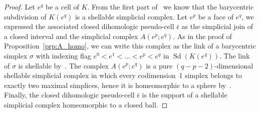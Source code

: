 \documentclass[AHL,Unicode,longabstracts,published]{cedram}
\DeclareMathOperator{\Sd}{Sd}
\begin{document}
\begin{proof}
Let $e^q$ be a cell of $K$. From the first part of~\cite[Proposition~4.4 p.~12]{Bjo_pos_reg}
we know that the barycentric subdivision of $K(e^q)$ is a shellable simplicial complex. Let $e^p$ be a face of $e^q$, we expressed the associated closed dihomologic pseudo-cell $\bar{\epsilon}$ as the simplicial join of a closed interval and the simplicial complex $A(e^p;e^q)$. As in the proof of Proposition~\ref{prp:A_homo}, we can write this complex as the link of a barycentric simplex $\sigma$ with indexing flag $e^0<e^1<\dots<e^p<e^q$ in $\Sd(K(e^q))$. The link of $\sigma$ is shellable by~\cite[Lemma~8.7 p.~237]{Zie_lec_pol}.
 The complex $A(e^p;e^q)$ is a pure $(q-p-2)$-dimensional shellable simplicial complex in which every codimension~1 simplex belongs to exactly two maximal simplices, hence it is homeomorphic to a sphere by~\cite[Proposition~4.3 p.~12]{Bjo_pos_reg}.
Finally, the closed dihomologic pseudo-cell $\bar{\epsilon}$ is the support of a shellable simplicial complex homeomorphic to a closed ball.
\end{proof}
\end{document}
